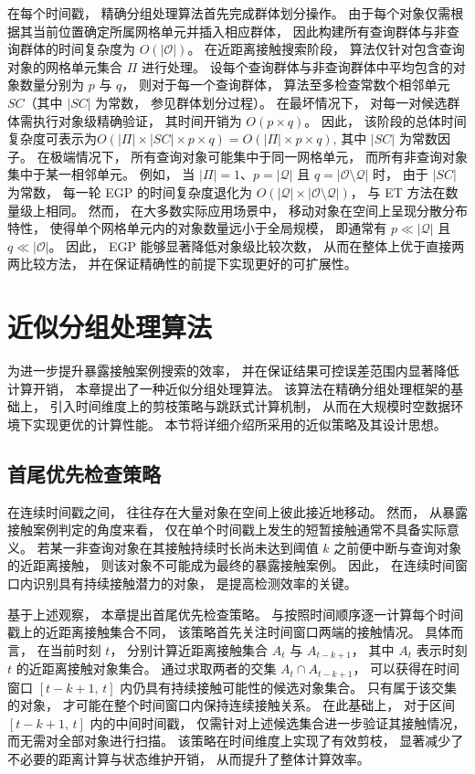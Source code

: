 在每个时间戳， 精确分组处理算法首先完成群体划分操作。 由于每个对象仅需根据其当前位置确定所属网格单元并插入相应群体， 因此构建所有查询群体与非查询群体的时间复杂度为 $O(|\mathcal{O}|)$。 在近距离接触搜索阶段， 算法仅针对包含查询对象的网格单元集合 $\Pi$ 进行处理。 设每个查询群体与非查询群体中平均包含的对象数量分别为 $p$ 与 $q$， 则对于每一个查询群体， 算法至多检查常数个相邻单元 $SC$（其中 $|SC|$ 为常数， 参见群体划分过程）。 在最坏情况下， 对每一对候选群体需执行对象级精确验证， 其时间开销为 $O(p \times q)$。 因此， 该阶段的总体时间复杂度可表示为$O(|\Pi| \times |SC| \times p \times q)=O(|\Pi| \times p \times q)$, 其中 $|SC|$ 为常数因子。 在极端情况下， 所有查询对象可能集中于同一网格单元， 而所有非查询对象集中于某一相邻单元。 例如， 当 $|\Pi|=1$、$p=|\mathcal{Q}|$ 且 $q=|\mathcal{O}\setminus\mathcal{Q}|$ 时， 由于 $|SC|$ 为常数， 每一轮 EGP 的时间复杂度退化为 $O(|\mathcal{Q}| \times |\mathcal{O}\setminus\mathcal{Q}|)$， 与 ET 方法在数量级上相同。 然而， 在大多数实际应用场景中， 移动对象在空间上呈现分散分布特性， 使得单个网格单元内的对象数量远小于全局规模， 即通常有 $p \ll |\mathcal{Q}|$ 且 $q \ll |\mathcal{O}|$。 因此， EGP 能够显著降低对象级比较次数， 从而在整体上优于直接两两比较方法， 并在保证精确性的前提下实现更好的可扩展性。

\section{近似分组处理算法}

为进一步提升暴露接触案例搜索的效率， 并在保证结果可控误差范围内显著降低计算开销， 本章提出了一种近似分组处理算法。 该算法在精确分组处理框架的基础上， 引入时间维度上的剪枝策略与跳跃式计算机制， 从而在大规模时空数据环境下实现更优的计算性能。 本节将详细介绍所采用的近似策略及其设计思想。

\subsection{首尾优先检查策略}

在连续时间戳之间， 往往存在大量对象在空间上彼此接近地移动。 然而， 从暴露接触案例判定的角度来看， 仅在单个时间戳上发生的短暂接触通常不具备实际意义。 若某一非查询对象在其接触持续时长尚未达到阈值 $k$ 之前便中断与查询对象的近距离接触， 则该对象不可能成为最终的暴露接触案例。 因此， 在连续时间窗口内识别具有持续接触潜力的对象， 是提高检测效率的关键。

基于上述观察， 本章提出首尾优先检查策略。 与按照时间顺序逐一计算每个时间戳上的近距离接触集合不同， 该策略首先关注时间窗口两端的接触情况。 具体而言， 在当前时刻 $t$， 分别计算近距离接触集合 $A_t$ 与 $A_{t-k+1}$， 其中 $A_t$ 表示时刻 $t$ 的近距离接触对象集合。 通过求取两者的交集 $A_t \cap A_{t-k+1}$， 可以获得在时间窗口 $[t-k+1,\,t]$ 内仍具有持续接触可能性的候选对象集合。 只有属于该交集的对象， 才可能在整个时间窗口内保持连续接触关系。 在此基础上， 对于区间 $[t-k+1,\,t]$ 内的中间时间戳， 仅需针对上述候选集合进一步验证其接触情况， 而无需对全部对象进行扫描。 该策略在时间维度上实现了有效剪枝， 显著减少了不必要的距离计算与状态维护开销， 从而提升了整体计算效率。

